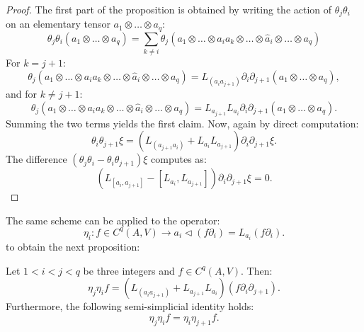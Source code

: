 \begin{proof}
The first part of the proposition is obtained by writing the action of $\theta_j \theta_i$ on an elementary tensor $a_1 \otimes \dots \otimes a_q :$
\begin{equation}
    \theta_j \theta_i \left(a_1 \otimes \dots \otimes a_q\right) = 
    \sum_{k \neq i} \theta_j \left( a_1 \otimes \dots \otimes a_i a_k \otimes \dots \otimes \hat{a}_i \otimes \dots \otimes a_q \right)
\end{equation}
For $k=j+1:$
\begin{equation}
    \theta_j \left( a_1 \otimes \dots \otimes a_i a_k \otimes \dots \otimes \hat{a}_i \otimes \dots \otimes a_q \right) = 
    L_{(a_i a_{j+1})} \partial_i \partial_{j+1} \left(a_1 \otimes \dots \otimes a_q \right),
\end{equation}
and for $k \neq j+1:$
\begin{equation}
    \theta_j \left( a_1 \otimes \dots \otimes a_i a_k \otimes \dots \otimes \hat{a}_i \otimes \dots \otimes a_q \right) = 
    L_{a_{j+1}} L_{a_i} \partial_i \partial_{j+1}\left(a_1 \otimes \dots \otimes a_q \right).
\end{equation}
Summing the two terms yields the first claim. Now, again by direct computation:
\begin{equation}
    \theta_i \theta_{j+1} \xi = 
    \left(L_{(a_{j+1}a_i)} + L_{a_i}L_{a_{j+1}}\right)\partial_i \partial_{j+1} \xi.
\end{equation}
The difference $ \left(\theta_j \theta_i  - \theta_{i} \theta_{j+1}\right) \xi$ computes as:
\begin{equation}
    \left(L_{[a_i,a_{j+1}]} - \left[L_{a_i},L_{a_{j+1}}\right]\right)\partial_i \partial_{j+1} \xi = 0.
\end{equation}
\end{proof}
The same scheme can be applied to the operator:
\begin{equation}
    \label{eq:first_term_delta}
    \eta_i \colon f \in C^q(A,V) \to a_i \triangleleft \left( f \partial_i \right) = L_{a_i}\left( f \partial_i \right).
\end{equation}
to obtain the next proposition:
\begin{prop}
\label{prop:eta_simplicial}
Let $1 < i < j < q$ be three integers and $f \in C^q(A,V)$. Then:
\begin{equation}
\label{eq:eta_expression}
    \eta_j \eta_i f = \left(L_{(a_i a_{j+1})}  + L_{a_{j+1}}L_{a_i} \right)\left(f \partial_i \partial_{j+1} \right).
\end{equation}
Furthermore, the following semi-simplicial identity holds:
\begin{equation}
    \label{eq:eta_simplicial}
    \eta_j \eta_i f = \eta_{i} \eta_{j+1} f.
\end{equation}
\end{prop}

